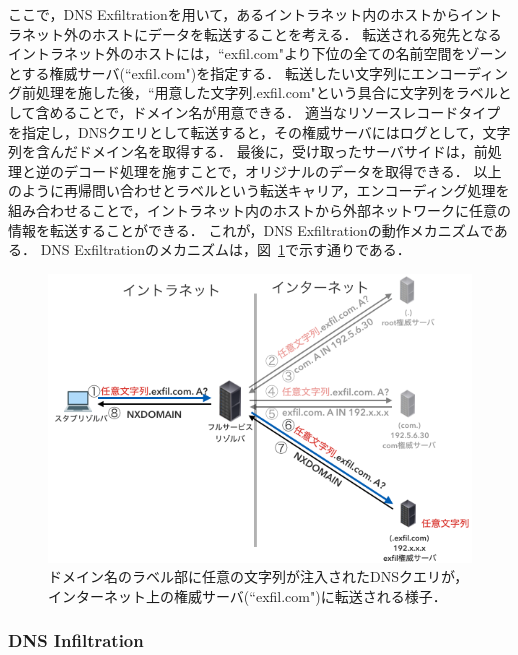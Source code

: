 ここで，DNS Exfiltrationを用いて，あるイントラネット内のホストからイントラネット外のホストにデータを転送することを考える．
転送される宛先となるイントラネット外のホストには，``exfil.com"より下位の全ての名前空間をゾーンとする権威サーバ(``exfil.com")を指定する．
転送したい文字列にエンコーディング前処理を施した後，``用意した文字列.exfil.com"という具合に文字列をラベルとして含めることで，ドメイン名が用意できる．
適当なリソースレコードタイプを指定し，DNSクエリとして転送すると，その権威サーバにはログとして，文字列を含んだドメイン名を取得する．
最後に，受け取ったサーバサイドは，前処理と逆のデコード処理を施すことで，オリジナルのデータを取得できる．
以上のように再帰問い合わせとラベルという転送キャリア，エンコーディング処理を組み合わせることで，イントラネット内のホストから外部ネットワークに任意の情報を転送することができる．
これが，DNS Exfiltrationの動作メカニズムである．
DNS Exfiltrationのメカニズムは，図~\ref{fig:dns-exfiltration}で示す通りである．
\begin{figure}[htbp]
 \centering
 \includegraphics[scale=0.3]{figure/dns-exfiltration.png}
 \caption[DNS Exfiltrationの概略図]{ドメイン名のラベル部に任意の文字列が注入されたDNSクエリが，インターネット上の権威サーバ(``exfil.com")に転送される様子．}
 \label{fig:dns-exfiltration}
\end{figure}

\subsubsection{DNS Infiltration}
\label{sec:dns-infiltration}

